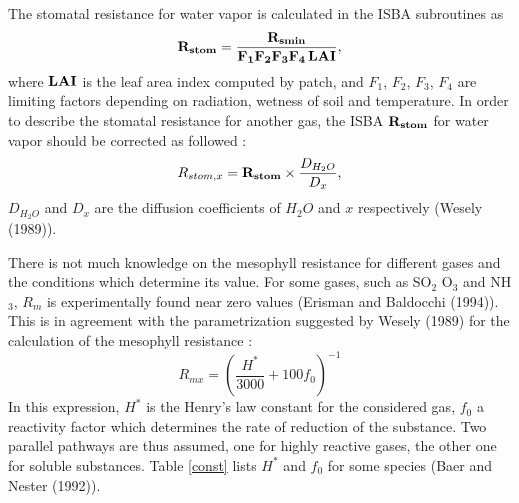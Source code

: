 The stomatal resistance for water vapor is calculated in the ISBA subroutines
as \[ \bf{R_{stom}}=\frac{R_{smin}}{F_1 F_2 F_3 F_4\, LAI},\] where
$\bf{LAI}$ is the leaf area index computed by patch, and $F_1$, $F_2$,
$F_3$, $F_4$ are limiting factors depending on 
radiation, wetness of soil and temperature. In order to describe the stomatal
resistance for another gas, the ISBA $\bf{R_{stom}}$ for water vapor should be
corrected as followed :
\[ R_{stom,x}={\bf{R_{stom}}} \times \frac{D_{H_2O}}{D_x},\]
$D_{H_2O}$ and ${D_x}$ are the diffusion coefficients of $H_2O$ and $x$
respectively (Wesely (1989)).

\medskip

There is not much knowledge on the mesophyll resistance for different gases and
the conditions which determine its value. For some gases, such as SO$_2$ %
O$_3$ %
and NH$_3$, %
$R_m$ is experimentally found near zero values (Erisman and Baldocchi (1994)).
This is in agreement with the parametrization suggested by Wesely (1989)
for the calculation of the mesophyll resistance :
\[ R_{mx} = ( \frac{H^*}{3000} + 100 f_0) ^{-1} \] 
In this expression, $H^*$ is the Henry's law constant for the considered gas,
$f_0$ a reactivity factor which determines the rate of reduction of the
substance. Two parallel pathways are thus assumed, one for highly reactive
gases, the other one for soluble substances. Table \ref{const} 
lists $H^*$ and
$f_0$ for some species (Baer and Nester (1992)).

